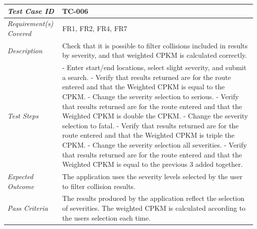 \documentclass[authoryearcitations]{UoYCSproject}
\begin{document}
\begin{tabular}{| p{2.5cm} | p{11cm} |}
	\hline
	\textit{Test Case ID} & TC-006 \\ \hline
	\textit{Requirement(s) Covered} & FR1, FR2, FR4, FR7 \\ \hline
	\textit{Description} & Check that it is possible to filter collisions included in results by severity, and that weighted CPKM is calculated correctly. \\ \hline
	\textit{Test Steps}& - Enter start/end locations, select slight severity, and submit a search.
	\newline - Verify that results returned are for the route entered and that the Weighted CPKM is equal to the CPKM.
	\newline - Change the severity selection to serious.
	\newline - Verify that results returned are for the route entered and that the Weighted CPKM is double the CPKM.
	\newline - Change the severity selection to fatal.
	\newline - Verify that results returned are for the route entered and that the Weighted CPKM is triple the CPKM.
	\newline - Change the severity selection all severities.
	\newline - Verify that results returned are for the route entered and that the Weighted CPKM is equal to the previous 3 added together.
 \\ \hline
	\textit{Expected Outcome} & The application uses the severity levels selected by the user to filter collision results.  \\ \hline
	\textit{Pass Criteria} & The results produced by the application reflect the selection of severities. The weighted CPKM is calculated according to the users selection each time. \\ \hline
\end{tabular}
\end{document}
